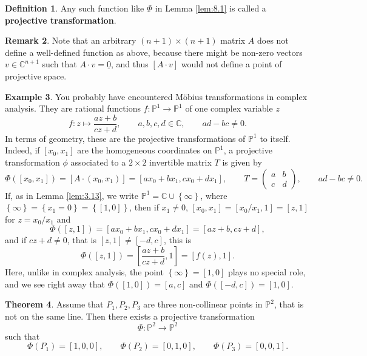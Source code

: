 \documentclass{article}
\newcommand{\C}{\mathbb{C}}
\renewcommand{\P}{\mathbb{P}}
\newcommand{\rb}[1]{\left( #1 \right)}
\renewcommand{\sb}[1]{\left[ #1 \right]}
\newcommand{\cb}[1]{\left\{ #1 \right\}}
\newcommand{\two}[2]{\begin{pmatrix} #1 \\ #2 \end{pmatrix}}
\theoremstyle{definition}\newtheorem{definition}{Definition}[section]
\theoremstyle{definition}\newtheorem{notation}[definition]{Notation}
\theoremstyle{definition}\newtheorem{remark}[definition]{Remark}
\theoremstyle{definition}\newtheorem{example}[definition]{Example}
\theoremstyle{definition}\newtheorem{fact}{Fact}
\theoremstyle{definition}\newtheorem{exercise}{Exercise}
\newtheorem{theorem}[definition]{Theorem}
\begin{document}
\begin{definition}
Any such function like $ \Phi $ in Lemma \ref{lem:8.1} is called a \textbf{projective transformation}.
\end{definition}

\begin{remark}
Note that an arbitrary $ \rb{n + 1} \times \rb{n + 1} $ matrix $ A $ does not define a well-defined function as above, because there might be non-zero vectors $ v \in \C^{n + 1} $ such that $ A \cdot v = \underline{0} $, and thus $ \sb{A \cdot v} $ would not define a point of projective space.
\end{remark}

\begin{example}
You probably have encountered Möbius transformations in complex analysis. They are rational functions $ f : \P^1 \to \P^1 $ of one complex variable $ z $
$$ f : z \mapsto \dfrac{az + b}{cz + d}, \qquad a, b, c, d \in \C, \qquad ad - bc \ne 0. $$
In terms of geometry, these are the projective transformations of $ \P^1 $ to itself. Indeed, if $ \sb{x_0, x_1} $ are the homogeneous coordinates on $ \P^1 $, a projective transformation $ \phi $ associated to a $ 2 \times 2 $ invertible matrix $ T $ is given by
$$ \Phi\rb{\sb{x_0, x_1}} = \sb{A \cdot \rb{x_0, x_1}} = \sb{ax_0 + bx_1, cx_0 + dx_1}, \qquad T = \two{a & b}{c & d}, \qquad ad - bc \ne 0. $$
If, as in Lemma \ref{lem:3.13}, we write $ \P^1 = \C \cup \cb{\infty} $, where $ \cb{\infty} = \cb{x_1 = 0} = \cb{\sb{1, 0}} $, then if $ x_1 \ne 0 $, $ \sb{x_0, x_1} = \sb{x_0 / x_1, 1} = \sb{z, 1} $ for $ z = x_0 / x_1 $ and
$$ \Phi\rb{\sb{z, 1}} = \sb{ax_0 + bx_1, cx_0 + dx_1} = \sb{az + b, cz + d}, $$
and if $ cz + d \ne 0 $, that is $ \sb{z, 1} \ne \sb{-d, c} $, this is
$$ \Phi\rb{\sb{z, 1}} = \sb{\dfrac{az + b}{cz + d}, 1} = \sb{f\rb{z}, 1}. $$
Here, unlike in complex analysis, the point $ \cb{\infty} = \sb{1, 0} $ plays no special role, and we see right away that $ \Phi\rb{\sb{1, 0}} = \sb{a, c} $ and $ \Phi\rb{\sb{-d, c}} = \sb{1, 0} $.
\end{example}

\begin{theorem}
\label{thm:8.5}
Assume that $ P_1, P_2, P_3 $ are three non-collinear points in $ \P^2 $, that is not on the same line. Then there exists a projective transformation
$$ \Phi : \P^2 \to \P^2 $$
such that
$$ \Phi\rb{P_1} = \sb{1, 0, 0}, \qquad \Phi\rb{P_2} = \sb{0, 1, 0}, \qquad \Phi\rb{P_3} = \sb{0, 0, 1}. $$
\end{theorem}
\end{document}
